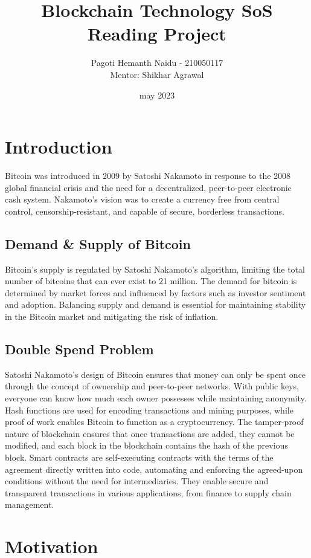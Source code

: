 \documentclass{report}
\title{Blockchain Technology SoS Reading Project}
\author{Pagoti Hemanth Naidu - 210050117 \\
Mentor: Shikhar Agrawal}
\date{may 2023}
\begin{document}
\maketitle
\tableofcontents
\newpage
\section{Introduction}

Bitcoin was introduced in 2009 by Satoshi Nakamoto in response to the 2008 global financial crisis and the need for a decentralized, peer-to-peer electronic cash system. 
Nakamoto's vision was to create a currency free from central control, censorship-resistant, and capable of secure, borderless transactions.
\subsection{Demand \& Supply of Bitcoin}
Bitcoin's supply is regulated by Satoshi Nakamoto's algorithm, limiting the total number of bitcoins that can ever exist to 21 million.
The demand for bitcoin is determined by market forces and influenced by factors such as investor sentiment and adoption. 
Balancing supply and demand is essential for maintaining stability in the Bitcoin market and mitigating the risk of inflation.
\subsection{Double Spend Problem}
Satoshi Nakamoto's design of Bitcoin ensures that money can only be spent once through the concept of ownership and peer-to-peer networks. With public keys, everyone can know how much each owner possesses while maintaining anonymity. 
Hash functions are used for encoding transactions and mining purposes, while proof of work enables Bitcoin to function as a cryptocurrency. 
The tamper-proof nature of blockchain ensures that once transactions are added, they cannot be modified, and each block in the blockchain contains the hash of the previous block.
Smart contracts are self-executing contracts with the terms of the agreement directly written into code, automating and enforcing the agreed-upon conditions without the need for intermediaries. 
They enable secure and transparent transactions in various applications, from finance to supply chain management.
\section{Motivation}
\end{document}
